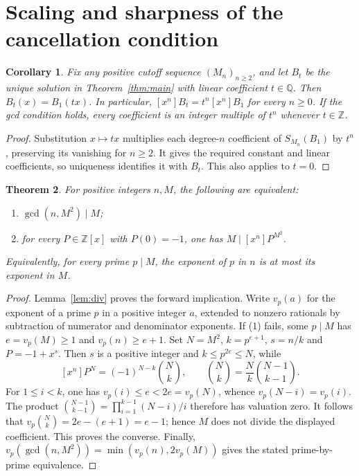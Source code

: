 \documentclass[11pt]{article}
\newtheorem{theorem}{Theorem}
\newtheorem{corollary}[theorem]{Corollary}
\newcommand{\Q}{\mathbb{Q}}
\newcommand{\Z}{\mathbb{Z}}
\begin{document}
\section{Scaling and sharpness of the cancellation condition}
\begin{corollary}\label{cor:scaling}
Fix any positive cutoff sequence $(M_n)_{n\geq2}$, and let $B_t$ be the
unique solution in Theorem~\ref{thm:main} with linear coefficient $t\in\Q$.
Then $B_t(x)=B_1(tx)$. In particular,
$[x^n]B_t=t^n[x^n]B_1$ for every $n\geq0$.
If the gcd condition holds, every coefficient is an integer multiple of
$t^n$ whenever $t\in\Z$.
\end{corollary}
\begin{proof}
Substitution $x\mapsto tx$ multiplies each degree-$n$ coefficient of
$S_{M_n}(B_1)$ by $t^n$, preserving its vanishing for $n\geq2$.
It gives the required constant and linear coefficients, so uniqueness
identifies it with $B_t$. This also applies to $t=0$.
\end{proof}

\begin{theorem}\label{thm:sharp}
For positive integers $n,M$, the following are equivalent:
\begin{enumerate}
\item $\gcd(n,M^2)\mid M$;
\item for every $P\in\Z[x]$ with $P(0)=-1$, one has
$M\mid[x^n]P^{M^2}$.
\end{enumerate}
Equivalently, for every prime $p\mid M$, the exponent of $p$ in $n$
is at most its exponent in $M$.
\end{theorem}
\begin{proof}
Lemma~\ref{lem:div} proves the forward implication.
Write $v_p(a)$ for the exponent of a prime $p$ in a positive integer $a$,
extended to nonzero rationals by subtraction of numerator and denominator
exponents. If (1) fails, some $p\mid M$ has
$e=v_p(M)\geq1$ and $v_p(n)\geq e+1$.
Set $N=M^2$, $k=p^{e+1}$, $s=n/k$ and $P=-1+x^s$.
Then $s$ is a positive integer and $k\leq p^{2e}\leq N$, while
\[
 [x^n]P^N=(-1)^{N-k}\binom Nk,
 \qquad \binom Nk=\frac Nk\binom{N-1}{k-1}.
\]
For $1\leq i<k$, one has $v_p(i)\leq e<2e=v_p(N)$, whence
$v_p(N-i)=v_p(i)$. The product
$\binom{N-1}{k-1}=\prod_{i=1}^{k-1}(N-i)/i$ therefore has valuation zero.
It follows that $v_p\binom Nk=2e-(e+1)=e-1$; hence $M$ does not divide
the displayed coefficient. This proves the converse.
Finally, $v_p(\gcd(n,M^2))=\min(v_p(n),2v_p(M))$ gives the stated
prime-by-prime equivalence.
\end{proof}
\end{document}

